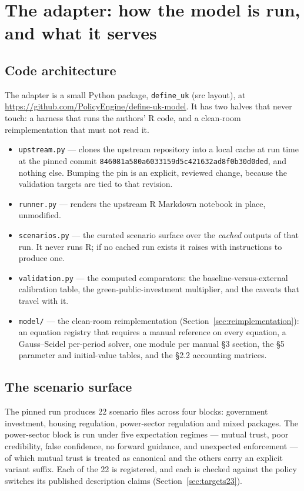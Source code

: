\section{The adapter: how the model is run, and what it serves}
\label{sec:implementation}

\subsection{Code architecture}

The adapter is a small Python package, \texttt{define\_uk} (src layout), at \url{https://github.com/PolicyEngine/define-uk-model}. It has two halves that never touch: a harness that runs the authors' R code, and a clean-room reimplementation that must not read it.

\begin{itemize}
\item \texttt{upstream.py} --- clones the upstream repository into a local cache at run time at the pinned commit \texttt{846081a580a6033159d5c421632ad8f0b30d0ded}, and nothing else. Bumping the pin is an explicit, reviewed change, because the validation targets are tied to that revision.
\item \texttt{runner.py} --- renders the upstream R Markdown notebook in place, unmodified.
\item \texttt{scenarios.py} --- the curated scenario surface over the \emph{cached} outputs of that run. It never runs R; if no cached run exists it raises with instructions to produce one.
\item \texttt{validation.py} --- the computed comparators: the baseline-versus-external calibration table, the green-public-investment multiplier, and the caveats that travel with it.
\item \texttt{model/} --- the clean-room reimplementation (Section~\ref{sec:reimplementation}): an equation registry that requires a manual reference on every equation, a Gauss--Seidel per-period solver, one module per manual \S3 section, the \S5 parameter and initial-value tables, and the \S2.2 accounting matrices.
\end{itemize}

\subsection{The scenario surface}

The pinned run produces 22 scenario files across four blocks: government investment, housing regulation, power-sector regulation and mixed packages. The power-sector block is run under five expectation regimes --- mutual trust, poor credibility, false confidence, no forward guidance, and unexpected enforcement --- of which mutual trust is treated as canonical and the others carry an explicit variant suffix. Each of the 22 is registered, and each is checked against the policy switches its published description claims (Section~\ref{sec:targets23}).

